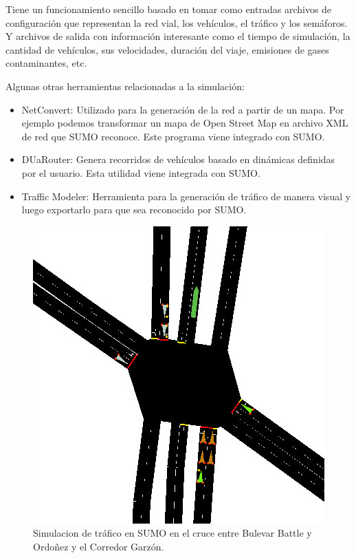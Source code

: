 Tiene un funcionamiento sencillo basado en tomar como entradas archivos de configuración que representan la red vial, los vehículos, el tráfico y los semáforos. Y archivos de salida con información interesante como el tiempo de simulación, la cantidad de vehículos, sus velocidades, duración del viaje, emisiones de gases contaminantes, etc. 

Algunas otras herramientas relacionadas a la simulación:

\begin{itemize}
	
	\item  NetConvert: Utilizado para la generación de la red a partir de un mapa. Por ejemplo podemos transformar un mapa de Open Street Map en archivo XML de red que SUMO reconoce. Este programa viene integrado con SUMO.
	\item DUaRouter: Genera recorridos de vehículos basado en dinámicas definidas por el usuario. Esta utilidad viene integrada con SUMO.
	\item Traffic Modeler: Herramienta para la generación de tráfico de manera visual y luego exportarlo para que sea reconocido por SUMO. \citep{TrafficModeler}
	
	
\end{itemize}

\begin{figure}[H]
	\centering
	\includegraphics[width=0.7\linewidth]{Figures/sim1}
	\caption{Simulacion de tráfico en SUMO en el cruce entre Bulevar Battle y Ordoñez y el Corredor Garzón.}
	\label{fig:sim1}
\end{figure}



